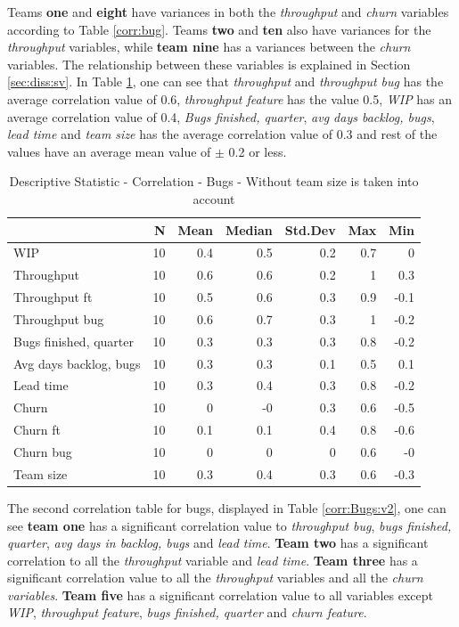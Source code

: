 \documentclass[UKenglish]{ifimaster}  %
\begin{document}
Teams \textbf{one} and \textbf{eight} have variances in both the \textit{throughput} and \textit{churn} variables according to Table \ref{corr:bug}. Teams \textbf{two} and \textbf{ten} also have variances for the \textit{throughput} variables, while \textbf{team nine} has a variances between the \textit{churn} variables. The relationship between these variables is explained in  Section \ref{sec:diss:sv}.
In Table \ref{DS:corr:Bugs}, one can see that \textit{throughput} and \textit{throughput bug} has the average correlation value of 0.6, \textit{throughput feature} has the value 0.5, \textit{WIP} has an average correlation value of 0.4,  \textit{Bugs finished, quarter}, \textit{avg days backlog, bugs}, \textit{lead time} and \textit{team size} has the average correlation value of 0.3 and rest of the values have an average mean value of $\pm$ 0.2 or less.

\begin{table} [h]
 \centering
 \begin{tabular}{ | l | r | r | r | r | r | r | }
 \hline
& \bf{N} & \bf{Mean} & \bf{Median} & \bf{Std.Dev} & \bf{Max} & \bf{Min} \\ \hline
WIP  & 10 & 0.4 & 0.5 & 0.2 & 0.7 & 0\\ \hline
Throughput  & 10 & 0.6 & 0.6 & 0.2 & 1 & 0.3\\ \hline
Throughput ft  & 10 & 0.5 & 0.6 & 0.3 & 0.9 & -0.1\\ \hline
Throughput bug  & 10 & 0.6 & 0.7 & 0.3 & 1 & -0.2\\ \hline
Bugs finished, quarter  & 10 & 0.3 & 0.3 & 0.3 & 0.8 & -0.2\\ \hline
Avg days backlog, bugs  & 10 & 0.3 & 0.3 & 0.1 & 0.5 & 0.1\\ \hline
Lead time & 10 & 0.3 & 0.4 & 0.3 & 0.8 & -0.2\\ \hline
Churn  & 10 & 0 & -0 & 0.3 & 0.6 & -0.5\\ \hline
Churn ft  & 10 & 0.1 & 0.1 & 0.4 & 0.8 & -0.6\\ \hline
Churn bug  & 10 & 0 & 0 & 0 & 0.6 & -0\\ \hline
Team size  & 10 & 0.3 & 0.4 & 0.3 & 0.6 & -0.3\\ \hline
\end{tabular}
 \caption{Descriptive Statistic - Correlation - Bugs - Without team size is taken into account}
 \label{DS:corr:Bugs}
 \end{table}
 \newpage
The second correlation table for bugs, displayed in Table \ref{corr:Bugs:v2}, one can see \textbf{team one} has a significant correlation value to \textit{throughput bug}, \textit{bugs finished, quarter}, \textit{avg days in backlog, bugs} and \textit{lead time}. \textbf{Team two} has a significant correlation to all the \textit{throughput} variable and \textit{lead time}. \textbf{Team three} has a significant correlation value to all the \textit{throughput} variables and all the \textit{churn variables}. \textbf{Team five} has a significant correlation value to all variables except \textit{WIP}, \textit{throughput feature}, \textit{bugs finished, quarter} and \textit{churn feature}.
\end{document}
